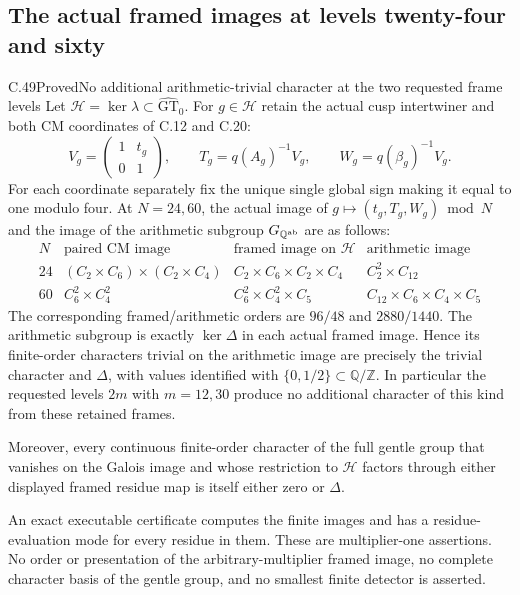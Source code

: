\subsection{The actual framed images at levels twenty-four and sixty}

\begin{statement}{C.49}{Proved}{No additional arithmetic-trivial character at the two requested frame levels}
Let $\mathcal H=\ker\lambda\subset\widehat{\mathrm{GT}}_0$.
For $g\in\mathcal H$ retain the actual cusp intertwiner and both
CM coordinates of C.12 and C.20:
\[
 V_g=\begin{pmatrix}1&t_g\\0&1\end{pmatrix},\qquad
 T_g=q(A_g)^{-1}V_g,\qquad W_g=q(\beta_g)^{-1}V_g.
                                                               \tag{C.49.1}
\]
For each coordinate separately fix the unique single global sign
making it equal to one modulo four. At $N=24,60$, the actual
image of $g\mapsto(t_g,T_g,W_g)\bmod N$ and the image of the
arithmetic subgroup $G_{\mathbb Q^{\rm ab}}$ are as follows:
\[
\begin{array}{c|c|c|c}
 N&\text{paired CM image}&\text{framed image on }\mathcal H
       &\text{arithmetic image}\\\hline
24&(C_2\times C_6)\times(C_2\times C_4)
   &C_2\times C_6\times C_2\times C_4&C_2^2\times C_{12}\\
60&C_6^2\times C_4^2
   &C_6^2\times C_4^2\times C_5&C_{12}\times C_6\times C_4\times C_5
\end{array}                                                    \tag{C.49.2}
\]
The corresponding framed/arithmetic orders are $96/48$ and
$2880/1440$. The arithmetic subgroup is exactly $\ker\Delta$
in each actual framed image. Hence its finite-order characters
trivial on the arithmetic image are precisely the trivial character
and $\Delta$, with values identified with $\{0,1/2\}\subset\mathbb Q/\mathbb Z$.
In particular the requested levels $2m$ with $m=12,30$ produce
no additional character of this kind from these retained frames.

Moreover, every continuous finite-order character of the full gentle
group that vanishes on the Galois image and whose restriction to
$\mathcal H$ factors through either displayed framed residue map
is itself either zero or $\Delta$.

An exact executable certificate computes the finite images and
has a residue-evaluation mode for every residue in them. These
are multiplier-one assertions. No order or presentation of the
arbitrary-multiplier framed image, no complete character basis
of the gentle group, and no smallest finite detector is asserted.
\end{statement}

